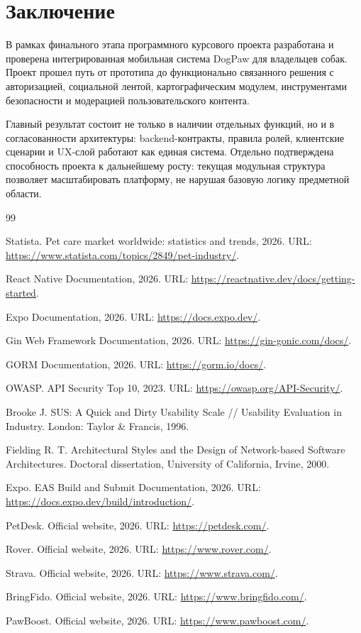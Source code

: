 \documentclass[12pt,a4paper]{article}
\begin{document}
\section{Заключение}

В рамках финального этапа программного курсового проекта разработана и проверена интегрированная мобильная система DogPaw для владельцев собак. Проект прошел путь от прототипа до функционально связанного решения с авторизацией, социальной лентой, картографическим модулем, инструментами безопасности и модерацией пользовательского контента.

Главный результат состоит не только в наличии отдельных функций, но и в согласованности архитектуры: backend-контракты, правила ролей, клиентские сценарии и UX-слой работают как единая система. Отдельно подтверждена способность проекта к дальнейшему росту: текущая модульная структура позволяет масштабировать платформу, не нарушая базовую логику предметной области.


\begin{thebibliography}{99}

Statista. Pet care market worldwide: statistics and trends, 2026. URL: \url{https://www.statista.com/topics/2849/pet-industry/}.

React Native Documentation, 2026. URL: \url{https://reactnative.dev/docs/getting-started}.

Expo Documentation, 2026. URL: \url{https://docs.expo.dev/}.

Gin Web Framework Documentation, 2026. URL: \url{https://gin-gonic.com/docs/}.

GORM Documentation, 2026. URL: \url{https://gorm.io/docs/}.

OWASP. API Security Top 10, 2023. URL: \url{https://owasp.org/API-Security/}.

Brooke J. SUS: A Quick and Dirty Usability Scale // Usability Evaluation in Industry. London: Taylor \& Francis, 1996.

Fielding R. T. Architectural Styles and the Design of Network-based Software Architectures. Doctoral dissertation, University of California, Irvine, 2000.

Expo. EAS Build and Submit Documentation, 2026. URL: \url{https://docs.expo.dev/build/introduction/}.

PetDesk. Official website, 2026. URL: \url{https://petdesk.com/}.

Rover. Official website, 2026. URL: \url{https://www.rover.com/}.

Strava. Official website, 2026. URL: \url{https://www.strava.com/}.

BringFido. Official website, 2026. URL: \url{https://www.bringfido.com/}.

PawBoost. Official website, 2026. URL: \url{https://www.pawboost.com/}.

\end{thebibliography}
\end{document}
